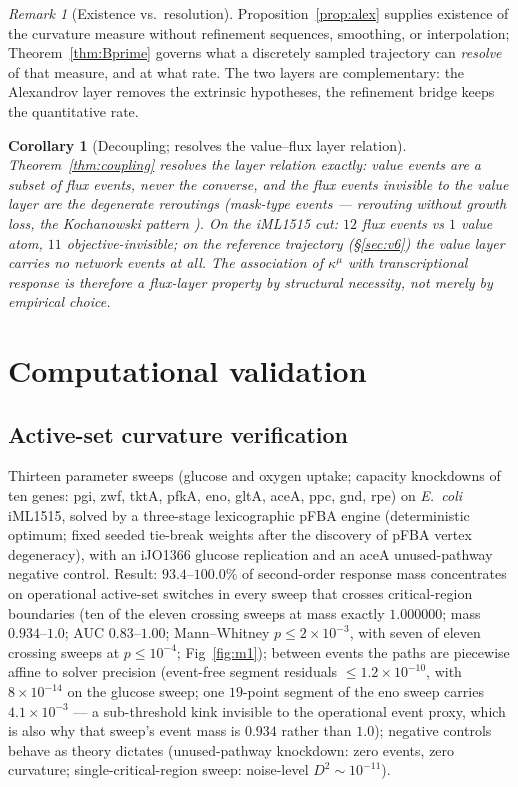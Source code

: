 \documentclass[11pt,a4paper]{article}
\theoremstyle{plain}
\newtheorem{corollary}[theorem]{Corollary}
\theoremstyle{definition}
\theoremstyle{remark}
\newtheorem{remark}[theorem]{Remark}
\newcommand{\kmu}{\kappa^{\mu}}
\begin{document}
\begin{remark}[Existence vs.\ resolution]
Proposition~\ref{prop:alex} supplies existence of the curvature measure
without refinement sequences, smoothing, or interpolation; Theorem~\ref{thm:Bprime} governs what a discretely sampled trajectory can \emph{resolve} of that
measure, and at what rate. The two layers are complementary: the
Alexandrov layer removes the extrinsic hypotheses, the refinement
bridge keeps the quantitative rate.
\end{remark}

\begin{corollary}[Decoupling; resolves the value--flux layer
relation]\label{conj:valueflux}
Theorem~\ref{thm:coupling} resolves the layer relation exactly: value
events are a subset of flux events, never the converse, and the flux
events invisible to the value layer are the degenerate reroutings
(mask-type events --- rerouting without growth loss, the Kochanowski pattern \citep{kochanowski2013}). On the iML1515 cut: $12$ flux events vs $1$ value atom, $11$ objective-invisible; on the reference trajectory (\S\ref{sec:v6}) the
value layer carries no network events at all. The association of
$\kmu$ with transcriptional response is therefore a flux-layer
property by structural necessity, not merely by empirical choice.
\end{corollary}

\section{Computational validation}\label{sec:computational}



\subsection{Active-set curvature verification}
\label{sec:m1}
Thirteen parameter sweeps (glucose and oxygen uptake; capacity
knockdowns of ten genes: pgi, zwf, tktA, pfkA, eno, gltA, aceA, ppc,
gnd, rpe) on \emph{E.~coli} iML1515, solved by a
three-stage lexicographic pFBA engine (deterministic optimum; fixed seeded
tie-break weights after the discovery of pFBA vertex degeneracy), with
an iJO1366 glucose replication and an aceA unused-pathway negative
control.
Result: $93.4$--$100.0\%$ of second-order response mass concentrates on
operational active-set switches in every sweep that crosses
critical-region boundaries (ten of the eleven crossing sweeps at mass
exactly $1.000000$; mass $0.934$--$1.0$; AUC $0.83$--$1.00$;
Mann--Whitney $p \le 2 \times 10^{-3}$, with seven of eleven crossing
sweeps at $p \le 10^{-4}$; Fig~\ref{fig:m1}); between events the paths are piecewise
affine to solver precision (event-free segment residuals $\le 1.2
\times 10^{-10}$, with $8 \times 10^{-14}$ on the glucose sweep; one
$19$-point segment of the eno sweep carries $4.1 \times 10^{-3}$ ---
a sub-threshold kink invisible to the operational event proxy, which
is also why that sweep's event mass is $0.934$ rather than $1.0$);
negative controls behave as theory dictates (unused-pathway knockdown:
zero events, zero curvature; single-critical-region sweep: noise-level
$D^2 \sim 10^{-11}$).
\end{document}
